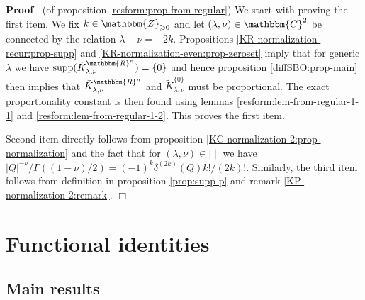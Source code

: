 \documentclass{article}
\newcommand{\tmop}[1]{\ensuremath{\operatorname{#1}}}
\newenvironment{proof}{\noindent\textbf{Proof\ }}{\hspace*{\fill}$\Box$\medskip}
\begin{document}
\begin{proof}
  (of proposition \ref{resform:prop-from-regular}) We start with proving the
  first item. We fix $k \in \mathbbm{Z}_{\geqslant 0}$ and let $(\lambda, \nu)
  \in \mathbbm{C}^2$ be connected by the relation $\lambda - \nu = - 2 k$.
  Propositions \ref{KR-normalization-recur:prop-supp} and
  \ref{KR-normalization-even:prop-zeroset} imply that for generic $\lambda$ we
  have $\tmop{supp} (\tilde{K}_{\lambda, \nu}^{\mathbbm{R}^n}) = \{ 0 \}$ and
  hence proposition \ref{diffSBO:prop-main} then implies that
  $\tilde{K}_{\lambda, \nu}^{\mathbbm{R}^n}$ and $\tilde{K}_{\lambda, \nu}^{\{
  0 \}}$ must be proportional. The exact proportionality constant is then
  found using lemmas \ref{resform:lem-from-regular-1-1} and
  \ref{resform:lem-from-regular-1-2}. This proves the first item.
  
  Second item directly follows from proposition
  \ref{KC-normalization-2:prop-normalization} and the fact that for $(\lambda,
  \nu) \in \mid \mid$ we have $| Q |^{- \nu} / \Gamma ((1 - \nu) / 2) = (-
  1)^k \delta^{(2 k)} (Q) k! / (2 k) !$. Similarly, the third item follows
  from definition in proposition \ref{prop:supp-p} and remark
  \ref{KP-normalization-2:remark}.
\end{proof}

\section{Functional identities}\label{sec:funcident}

\subsection{Main results}
\end{document}
